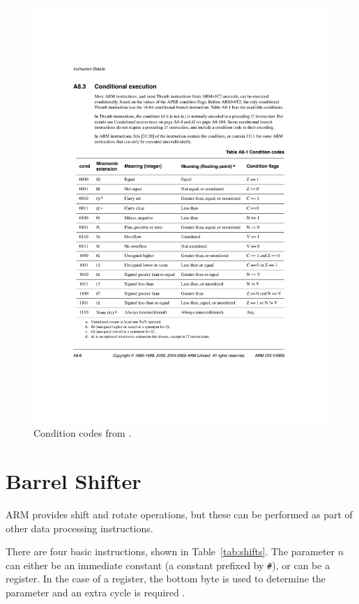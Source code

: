 \documentclass[oneside,a4paper]{report}
\begin{document}
\begin{figure}[htb]
	\centering
	\includegraphics[width=1.0\textwidth]{./fig/ConditionCodes.pdf}
	\caption{Condition codes from \cite[p. A8-8]{ARMRef}.}
	\label{fig:conditioncodes}
\end{figure}

\section{Barrel Shifter}\label{sec:barrelshifter}
ARM provides shift and rotate operations, but these can be performed as part of other data processing instructions.

There are four basic instructions, shown in Table~\ref{tab:shifts}. The parameter $n$ can either be an immediate constant (a constant prefixed by \texttt{\#}), or can be a register. In the case of a register, the bottom byte is used to determine the parameter and an extra cycle is required \cite[p. 31]{ARMInst}.
\end{document}
